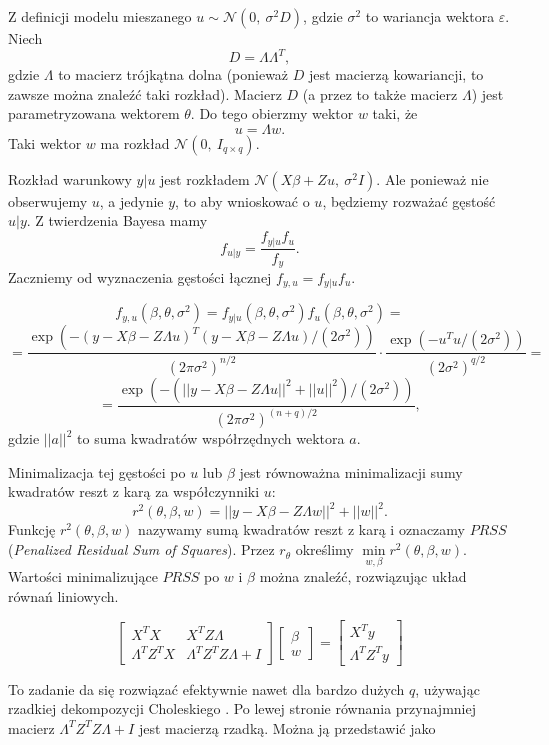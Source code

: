 \documentclass[12pt]{mwbk}
\theoremstyle{plain}
\theoremstyle{definition}
\theoremstyle{remark}
\begin{document}
Z definicji modelu mieszanego $u \sim \mathcal{N}(0,~\sigma^2D)$, gdzie $\sigma^2$ to wariancja wektora $\varepsilon$. Niech $$D=\Lambda \Lambda^T,$$ gdzie $\Lambda$ to macierz trójkątna dolna (ponieważ $D$ jest macierzą kowariancji, to zawsze można znaleźć taki rozkład). Macierz $D$ (a przez to także macierz $\Lambda$) jest parametryzowana wektorem $\theta$. Do tego obierzmy wektor $w$ taki, że $$u=\Lambda w.$$ Taki wektor $w$ ma rozkład $\mathcal{N}(0,~I_{q \times q})$.

Rozkład warunkowy $y|u$ jest rozkładem $\mathcal{N}(X\beta+Zu,~\sigma^2I)$. Ale ponieważ nie obserwujemy $u$, a jedynie $y$, to aby wnioskować o $u$, będziemy rozważać gęstość $u|y$. Z twierdzenia Bayesa \cite{bayes} mamy $$f_{u|y}=\frac{f_{y|u}f_u}{f_y}.$$ Zaczniemy od wyznaczenia gęstości łącznej $f_{y,u}=f_{y|u}f_u$.

$$f_{y,u}(\beta, \theta, \sigma^2)=f_{y|u}(\beta, \theta, \sigma^2)f_u(\beta, \theta, \sigma^2)=$$
$$=\frac{\exp(-(y-X\beta -Z \Lambda u)^T(y-X\beta-Z\Lambda u)/(2\sigma^2))}{(2\pi \sigma^2)^{n/2}}\cdot \frac{\exp(-u^Tu/(2\sigma^2))}{(2\sigma^2)^{q/2}}=$$
$$=\frac{\exp(-(||y-X\beta-Z\Lambda u||^2+||u||^2)/(2\sigma^2))}{(2\pi \sigma^2)^{(n+q)/2}},$$ gdzie $||a||^2$ to suma kwadratów współrzędnych wektora $a$.

Minimalizacja tej gęstości po $u$ lub $\beta$ jest równoważna minimalizacji sumy kwadratów reszt z karą za współczynniki $u$:
$$r^2(\theta, \beta, w)=||y-X\beta-Z\Lambda w||^2+||w||^2.$$ Funkcję $r^2(\theta, \beta, w)$ nazywamy sumą kwadratów reszt z karą i oznaczamy $PRSS$ (\textit{Penalized Residual Sum of Squares}). Przez $r_{\theta}$ określimy $\min\limits_{w,\beta} r^2(\theta, \beta,w)$. Wartości minimalizujące $PRSS$ po $w$ i $\beta$ można znaleźć, rozwiązując układ równań liniowych.

\begin{equation} \label{eq:ukladPRSS}
\begin{bmatrix}
X^TX & X^TZ\Lambda \\
\Lambda^TZ^TX & \Lambda^TZ^TZ\Lambda +I
\end{bmatrix}
\begin{bmatrix}
\beta \\
w
\end{bmatrix}=
\begin{bmatrix}
X^Ty\\
\Lambda^TZ^Ty
\end{bmatrix}
\end{equation}

To zadanie da się rozwiązać efektywnie nawet dla bardzo dużych $q$, używając rzadkiej dekompozycji Choleskiego \cite{cholesky}. Po lewej stronie równania przynajmniej macierz $\Lambda^TZ^TZ\Lambda+I$ jest macierzą rzadką. Można ją przedstawić jako
\end{document}
